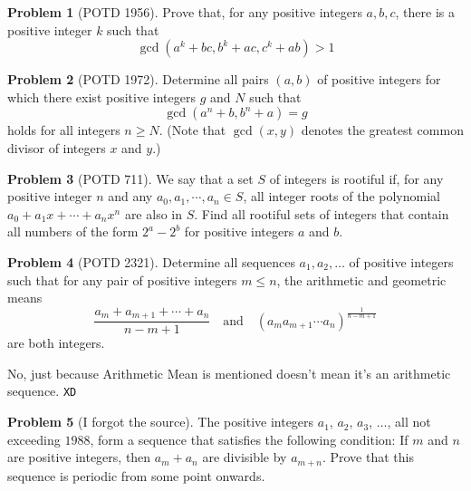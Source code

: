 \documentclass[11pt]{article} %
\theoremstyle{definition}
\newtheorem{problem}{Problem}
\theoremstyle{remark}
\begin{document}
\begin{problem}[POTD 1956]
    Prove that, for any positive integers \(a,b,c\), there is a positive integer \(k\) such that \[\gcd(a^k+bc,b^k+ac,c^k+ab)>1\]
\end{problem}

\begin{problem}[POTD 1972]
    Determine all pairs \((a,b)\) of positive integers for which there exist positive integers \(g\) and \(N\) such that \[\gcd (a^n+b,b^n+a)=g\]holds for all integers \(n\geqslant N.\) (Note that \(\gcd(x, y)\) denotes the greatest common divisor of integers \(x\) and \(y.\))
\end{problem}

\begin{problem}[POTD 711]
    We say that a set \(S\) of integers is rootiful if, for any positive integer \(n\) and any \(a_0, a_1, \cdots, a_n \in S\), all integer roots of the polynomial \(a_0+a_1x+\cdots+a_nx^n\) are also in \(S\). Find all rootiful sets of integers that contain all numbers of the form \(2^a - 2^b\) for positive integers \(a\) and \(b\).
\end{problem}

\begin{problem}[POTD 2321]
    Determine all sequences \(a_1, a_2, \dots\) of positive integers such that for any pair of positive integers \(m\leqslant n\), the arithmetic and geometric means
    \[ \frac{a_m + a_{m+1} + \cdots + a_n}{n-m+1}\quad\text{and}\quad (a_ma_{m+1}\cdots a_n)^{\frac{1}{n-m+1}}\]
    are both integers.
    \begin{talks}
        \begin{talk}
            No, just because Arithmetic Mean is mentioned doesn't mean it's an arithmetic sequence. \texttt{XD}
        \end{talk}
    \end{talks}
\end{problem}

\begin{problem}[I forgot the source]
    The positive integers \(a_1\), \(a_2\), \(a_3\), \(\dots\), all not exceeding \(1988\), form a sequence that satisfies the following condition: If \(m\) and \(n\) are positive integers, then \(a_m + a_n\) are divisible by \(a_{m+n}\). Prove that this sequence is periodic from some point onwards.
\end{problem}
\end{document}
